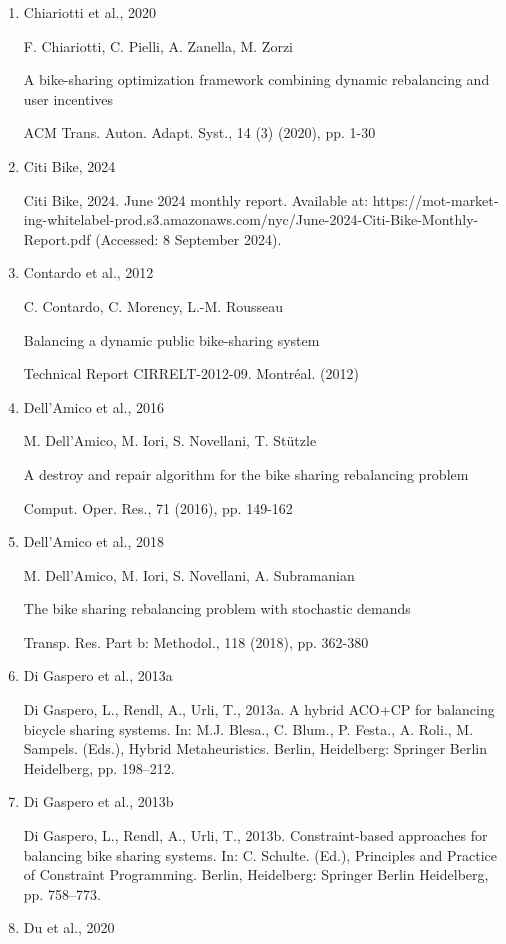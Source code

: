 \documentclass[
  english,
]{article}
\begin{document}
\begin{otherlanguage}{english}
\begin{enumerate}
  Y. Cheng, J. Wang, Y. Wang

  A user-based bike rebalancing strategy for free-floating bike sharing systems: A bidding model

  Transp. Res. Part E: Logist. Transp. Rev., 154 (2021), Article 102438
\item
  Chiariotti et al., 2020

  F. Chiariotti, C. Pielli, A. Zanella, M. Zorzi

  A bike-sharing optimization framework combining dynamic rebalancing and user incentives

  ACM Trans. Auton. Adapt. Syst., 14 (3) (2020), pp. 1-30
\item
  Citi Bike, 2024

  Citi Bike, 2024. June 2024 monthly report. Available at:
  https://mot-marketing-whitelabel-prod.s3.amazonaws.com/nyc/June-2024-Citi-Bike-Monthly-Report.pdf
  (Accessed: 8 September 2024).
\item
  Contardo et al., 2012

  C. Contardo, C. Morency, L.-M. Rousseau

  Balancing a dynamic public bike-sharing system

  Technical Report CIRRELT-2012-09. Montréal. (2012)
\item
  Dell'Amico et al., 2016

  M. Dell'Amico, M. Iori, S. Novellani, T. Stützle

  A destroy and repair algorithm for the bike sharing rebalancing problem

  Comput. Oper. Res., 71 (2016), pp. 149-162
\item
  Dell'Amico et al., 2018

  M. Dell'Amico, M. Iori, S. Novellani, A. Subramanian

  The bike sharing rebalancing problem with stochastic demands

  Transp. Res. Part b: Methodol., 118 (2018), pp. 362-380
\item
  Di Gaspero et al., 2013a

  Di Gaspero, L., Rendl, A., Urli, T., 2013a. A hybrid ACO+CP for balancing bicycle sharing systems.
  In: M.J. Blesa., C. Blum., P. Festa., A. Roli., M. Sampels. (Eds.), Hybrid Metaheuristics. Berlin,
  Heidelberg: Springer Berlin Heidelberg, pp. 198--212.
\item
  Di Gaspero et al., 2013b

  Di Gaspero, L., Rendl, A., Urli, T., 2013b. Constraint-based approaches for balancing bike sharing
  systems. In: C. Schulte. (Ed.), Principles and Practice of Constraint Programming. Berlin,
  Heidelberg: Springer Berlin Heidelberg, pp. 758--773.
\item
  Du et al., 2020


\end{enumerate}
\end{otherlanguage}
\end{document}
